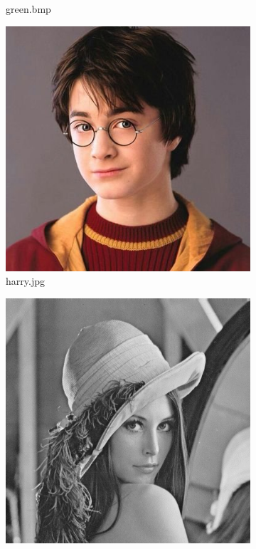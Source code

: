 \documentclass{l4proj}
\begin{document}
\begin{appendices}
\begin{figure}[!h]
\begin{subfigure}[b]{0.3\textwidth}
        \caption{green.bmp}
        \label{green.bmp}
    \end{subfigure}
    \begin{subfigure}[b]{0.3\textwidth}
        \includegraphics[width=\textwidth]{images/harry.jpg}
        \caption{harry.jpg}
        \label{harry.jpg}
    \end{subfigure}
    \begin{subfigure}[b]{0.3\textwidth}
        \includegraphics[width=\textwidth]{images/lena.png}

\end{subfigure}
\end{figure}
\end{appendices}
\end{document}

